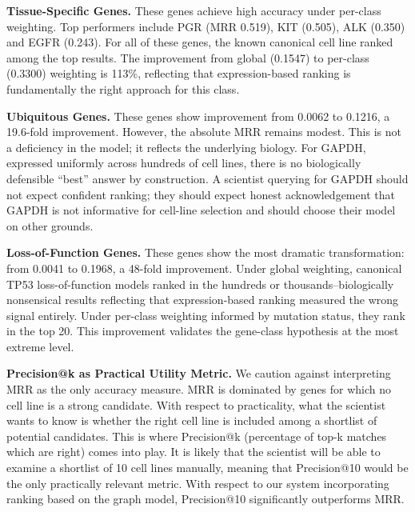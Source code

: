 \documentclass[author={Karen Coutinho, Ishaan Bhalla, Aman Raj, Dixit Kaloorani Malarmannan},
                supervisor={Dr. Daniel D'Andrea},
                degree={MSc},
                title={CellSelector Omics: A Multi-Omics Recommendation System for Cell Line Selection},
                subtitle={},
                type={},
                year={2026}]{dissertation}
\begin{document}
{\bf Tissue-Specific Genes.} These genes achieve high accuracy under per-class weighting. Top performers include PGR (MRR 0.519), KIT (0.505), ALK (0.350) and EGFR (0.243). For all of these genes, the known canonical cell line ranked among the top results. The improvement from global (0.1547) to per-class (0.3300) weighting is 113\%, reflecting that expression-based ranking is fundamentally the right approach for this class.

{\bf Ubiquitous Genes.} These genes show improvement from 0.0062 to 0.1216, a 19.6-fold improvement. However, the absolute MRR remains modest. This is not a deficiency in the model; it reflects the underlying biology. For GAPDH, expressed uniformly across hundreds of cell lines, there is no biologically defensible ``best'' answer by construction. A scientist querying for GAPDH should not expect confident ranking; they should expect honest acknowledgement that GAPDH is not informative for cell-line selection and should choose their model on other grounds.

{\bf Loss-of-Function Genes.} These genes show the most dramatic transformation: from 0.0041 to 0.1968, a 48-fold improvement. Under global weighting, canonical TP53 loss-of-function models ranked in the hundreds or thousands--biologically nonsensical results reflecting that expression-based ranking measured the wrong signal entirely. Under per-class weighting informed by mutation status, they rank in the top 20. This improvement validates the gene-class hypothesis at the most extreme level.

{\bf Precision@k as Practical Utility Metric.} We caution against interpreting MRR as the only accuracy measure. MRR is dominated by genes for which no cell line is a strong candidate. With respect to practicality, what the scientist wants to know is whether the right cell line is included among a shortlist of potential candidates. This is where Precision@k (percentage of top-k matches which are right) comes into play. It is likely that the scientist will be able to examine a shortlist of 10 cell lines manually, meaning that Precision@10 would be the only practically relevant metric. With respect to our system incorporating ranking based on the graph model, Precision@10 significantly outperforms MRR.
\end{document}
